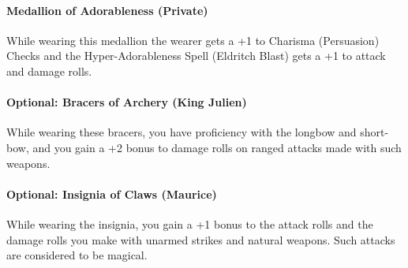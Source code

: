 {\entryfont \paragraph*{Medallion of Adorableness (Private)} While wearing this medallion the wearer gets a +1 to Charisma (Persuasion) Checks and the Hyper-Adorableness Spell (Eldritch Blast) gets a +1 to attack and damage rolls.}

{\entryfont \paragraph*{Optional: Bracers of Archery (King Julien)} While wearing these bracers, you have proficiency with the longbow and short-bow, and you gain a +2 bonus to damage rolls on ranged attacks made with such weapons.}

{\entryfont \paragraph*{Optional: Insignia of Claws (Maurice)} While wearing the insignia, you gain a +1 bonus to the attack rolls and the damage rolls you make with unarmed strikes and natural weapons. Such attacks are considered to be magical.}


